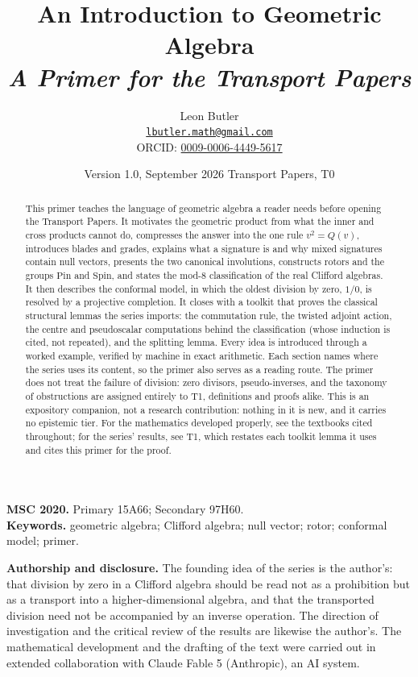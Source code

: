 \documentclass[11pt]{article}
\title{\bfseries An Introduction to Geometric Algebra\\[4pt]
  \large\itshape A Primer for the Transport Papers}
\author{Leon Butler\\ \normalsize\href{mailto:lbutler.math@gmail.com}{\texttt{lbutler.math@gmail.com}}\\ \normalsize ORCID: \href{https://orcid.org/0009-0006-4449-5617}{0009-0006-4449-5617}}
\date{Version 1.0, September 2026 \textperiodcentered{} Transport Papers, T0}
\theoremstyle{plain}
\theoremstyle{definition}
\newcommand{\Pin}{\mathrm{Pin}}
\newcommand{\Spin}{\mathrm{Spin}}
\begin{document}
\maketitle

\begin{abstract}
\normalsize
This primer teaches the language of geometric algebra a reader needs before opening the Transport Papers. It motivates the geometric product from what the inner and cross products cannot do, compresses the answer into the one rule $v^{2} = Q(v)$, introduces blades and grades, explains what a signature is and why mixed signatures contain null vectors, presents the two canonical involutions, constructs rotors and the groups $\Pin$ and $\Spin$, and states the mod-8 classification of the real Clifford algebras. It then describes the conformal model, in which the oldest division by zero, $1/0$, is resolved by a projective completion. It closes with a toolkit that proves the classical structural lemmas the series imports: the commutation rule, the twisted adjoint action, the centre and pseudoscalar computations behind the classification (whose induction is cited, not repeated), and the splitting lemma. Every idea is introduced through a worked example, verified by machine in exact arithmetic. Each section names where the series uses its content, so the primer also serves as a reading route. The primer does not treat the failure of division: zero divisors, pseudo-inverses, and the taxonomy of obstructions are assigned entirely to T1, definitions and proofs alike. This is an expository companion, not a research contribution: nothing in it is new, and it carries no epistemic tier. For the mathematics developed properly, see the textbooks cited throughout; for the series' results, see T1, which restates each toolkit lemma it uses and cites this primer for the proof.
\end{abstract}

\medskip
\noindent\textbf{MSC 2020.} Primary 15A66; Secondary 97H60.\\
\textbf{Keywords.} geometric algebra; Clifford algebra; null vector; rotor; conformal model; primer.

\newpage
\textbf{Authorship and disclosure. }The founding idea of the series is the author's: that division by zero in a Clifford algebra should be read not as a prohibition but as a transport into a higher-dimensional algebra, and that the transported division need not be accompanied by an inverse operation. The direction of investigation and the critical review of the results are likewise the author's. The mathematical development and the drafting of the text were carried out in extended collaboration with Claude Fable 5 (Anthropic), an AI system.
\end{document}
